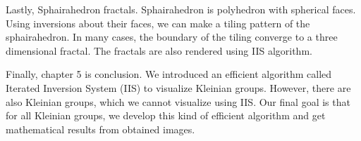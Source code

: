 \documentclass[uplatex, dvipdfmx]{article}
\begin{document}
Lastly, Sphairahedron fractals. Sphairahedron is polyhedron with spherical
faces. Using inversions about their faces, we can make a tiling pattern
of the sphairahedron. 
In many cases, the boundary of the tiling converge to a three
dimensional fractal. 
The fractals are also rendered using IIS algorithm.


Finally, chapter 5 is conclusion. We introduced an efficient algorithm
called Iterated Inversion System (IIS) to visualize Kleinian groups.
However, there are also Kleinian groups, which we cannot
visualize using IIS.
Our final goal is that for all Kleinian groups, we develop this kind of
efficient algorithm and get mathematical results from obtained images.
\end{document}
